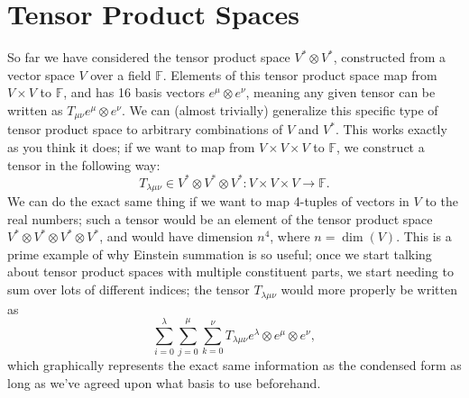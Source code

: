 \chapter{Tensor Product Spaces}
So far we have considered the tensor product space $V^* \otimes V^*$, constructed from a vector space $V$ over a field $\mathbb{F}$.
Elements of this tensor product space map from $V \times V$ to $\mathbb{F}$, and has 16 basis vectors $e^\mu \otimes e^\nu$, meaning any given tensor can be written as $T_{\mu\nu} e^\mu \otimes e^\nu$.
We can (almost trivially) generalize this specific type of tensor product space to arbitrary combinations of $V$ and $V^*$.
This works exactly as you think it does; if we want to map from $V \times V \times V$ to $\mathbb{F}$, we construct a tensor in the following way:
\[ T_{\lambda\mu\nu} \in V^* \otimes V^*\otimes V^* : V \times V \times V \to \mathbb{F}. \]
We can do the exact same thing if we want to map 4-tuples of vectors in $V$ to the real numbers; such a tensor would be an element of the tensor product space $V^* \otimes V^* \otimes V^* \otimes V^*$, and would have dimension $n^4$, where $n = \dim(V)$. This is a prime example of why Einstein summation is so useful; once we start talking about tensor product spaces with multiple constituent parts, we start needing to sum over lots of different indices; the tensor $T_{\lambda\mu\nu}$ would more properly be written as
\[ \sum_{i=0}^{\lambda}\sum_{j=0}^{\mu}\sum_{k=0}^{\nu} T_{\lambda\mu\nu} e^\lambda \otimes e^\mu \otimes e^\nu, \]
which graphically represents the exact same information as the condensed form as long as we've agreed upon what basis to use beforehand.

